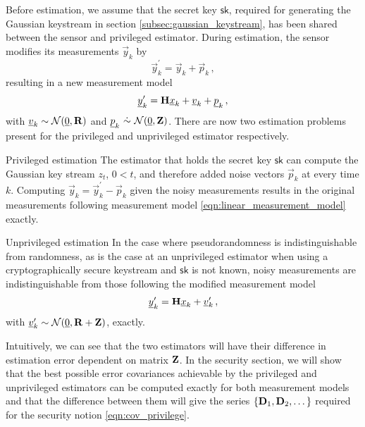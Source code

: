 \documentclass[letterpaper, 10 pt, conference]{IEEEtran}
\theoremstyle{definition}
\theoremstyle{definition}
\theoremstyle{remark}
\begin{document}
Before estimation, we assume that the secret key $\mathsf{sk}$, required for generating the Gaussian keystream in section \ref{subsec:gaussian_keystream}, has been shared between the sensor and privileged estimator. During estimation, the sensor modifies its measurements $\vec{y}_k$ by
\begin{equation}\label{eqn:modified_measurement}
   \vec{y}^\prime_k = \vec{y}_k + \vec{p}_k\,,
\end{equation}
resulting in a new measurement model
\begin{equation}
   {\underline{y}}^\prime_k = {{\mathbf{H}}}{\underline{x}}_k + {\underline{v}}_k + {\underline{p}}_k\,,
\end{equation}
with ${\underline{v}}_k\sim \mathcal{N}({\underline{0}},{{\mathbf{R}}})$ and $\vec{p}_k\ \dot{\sim}\ \mathcal{N}(\vec{0},\mat{Z})$. There are now two estimation problems present for the privileged and unprivileged estimator respectively.
\begin{LaTeXdescription}
   \item[Privileged estimation] The estimator that holds the secret key $\mathsf{sk}$ can compute the Gaussian key stream $z_t$, $0<t$, and therefore added noise vectors $\vec{p}_k$ at every time $k$. Computing $\vec{y}_k = \vec{y}^\prime_k - \vec{p}_k$ given the noisy measurements results in the original measurements following measurement model \eqref{eqn:linear_measurement_model} exactly.
   \item[Unprivileged estimation] In the case where pseudorandomness is indistinguishable from randomness, as is the case at an unprivileged estimator when using a cryptographically secure keystream and $\mathsf{sk}$ is not known, noisy measurements are indistinguishable from those following the modified measurement model 
   \begin{equation}
      {\underline{y}}^\prime_k = {{\mathbf{H}}}{\underline{x}}_k + {\underline{v}}^\prime_k\,,
   \end{equation}
   with ${\underline{v}}^\prime_k\sim \mathcal{N}({\underline{0}},{{\mathbf{R}}}+{{\mathbf{Z}}})$, exactly.
\end{LaTeXdescription}

Intuitively, we can see that the two estimators will have their difference in estimation error dependent on matrix ${{\mathbf{Z}}}$. In the security section, we will show that the best possible error covariances achievable by the privileged and unprivileged estimators can be computed exactly for both measurement models and that the difference between them will give the series $\{{{\mathbf{D}}}_1,{{\mathbf{D}}}_2,\dots\}$ required for the security notion \eqref{eqn:cov_privilege}.
\end{document}
